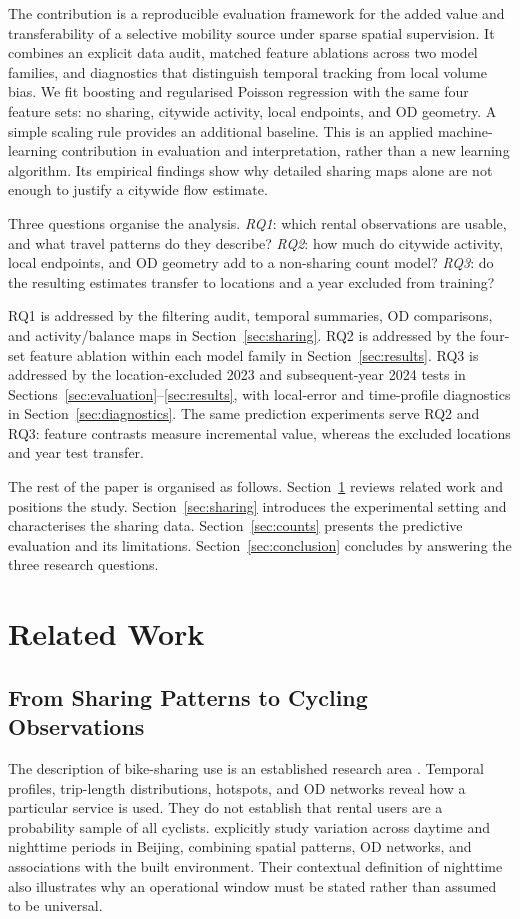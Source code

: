 \documentclass{interact}
\begin{document}
The contribution is a reproducible evaluation framework for the added value and transferability of a selective mobility source under sparse spatial supervision. It combines an explicit data audit, matched feature ablations across two model families, and diagnostics that distinguish temporal tracking from local volume bias. We fit boosting and regularised Poisson regression with the same four feature sets: no sharing, citywide activity, local endpoints, and OD geometry. A simple scaling rule provides an additional baseline. This is an applied machine-learning contribution in evaluation and interpretation, rather than a new learning algorithm. Its empirical findings show why detailed sharing maps alone are not enough to justify a citywide flow estimate.

Three questions organise the analysis. \emph{RQ1}: which rental observations are usable, and what travel patterns do they describe? \emph{RQ2}: how much do citywide activity, local endpoints, and OD geometry add to a non-sharing count model? \emph{RQ3}: do the resulting estimates transfer to locations and a year excluded from training?

RQ1 is addressed by the filtering audit, temporal summaries, OD comparisons, and activity/balance maps in Section~\ref{sec:sharing}. RQ2 is addressed by the four-set feature ablation within each model family in Section~\ref{sec:results}. RQ3 is addressed by the location-excluded 2023 and subsequent-year 2024 tests in Sections~\ref{sec:evaluation}--\ref{sec:results}, with local-error and time-profile diagnostics in Section~\ref{sec:diagnostics}. The same prediction experiments serve RQ2 and RQ3: feature contrasts measure incremental value, whereas the excluded locations and year test transfer.

The rest of the paper is organised as follows. Section~\ref{sec:related} reviews related work and positions the study. Section~\ref{sec:sharing} introduces the experimental setting and characterises the sharing data. Section~\ref{sec:counts} presents the predictive evaluation and its limitations. Section~\ref{sec:conclusion} concludes by answering the three research questions.

\section{Related Work}
\label{sec:related}
\subsection{From Sharing Patterns to Cycling Observations}
The description of bike-sharing use is an established research area \citep{fishman2016}. Temporal profiles, trip-length distributions, hotspots, and OD networks reveal how a particular service is used. They do not establish that rental users are a probability sample of all cyclists. \citet{yu2024} explicitly study variation across daytime and nighttime periods in Beijing, combining spatial patterns, OD networks, and associations with the built environment. Their contextual definition of nighttime also illustrates why an operational window must be stated rather than assumed to be universal.
\end{document}
